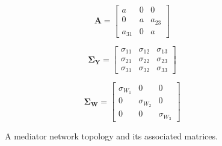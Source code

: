 \documentclass{article}
\begin{document}
\begin{figure}[H]
\centering

\def\figscale{1}

\begin{minipage}[c]{0.23\textwidth}
\centering

\def\a{1.2 cm}
\def\nodeSize{0.7}
\def\selfLoopR{0.5*\nodeSize cm}


\end{minipage}%
\hspace{0\textwidth}%
\begin{minipage}[c]{0.23\textwidth}
\raggedright

\[
\mathbf{A}=
\begin{bmatrix}
a & 0 & 0 \\
0 & a & a_{23} \\
a_{31} & 0 & a
\end{bmatrix}
\]

\end{minipage}%
\hspace{0.005\textwidth}%
\begin{minipage}[c]{0.25\textwidth}
\raggedright

\[
\mathbf{\Sigma_Y}=
\begin{bmatrix}
\sigma_{11} & \sigma_{12} & \sigma_{13} \\
\sigma_{21} & \sigma_{22} & \sigma_{23} \\
\sigma_{31} & \sigma_{32} & \sigma_{33}
\end{bmatrix}
\]

\end{minipage}%
\hspace{0.005\textwidth}%
\begin{minipage}[c]{0.27\textwidth}
\raggedright

\[
\mathbf{\Sigma_W}=
\begin{bmatrix}
\sigma_{W_1} & 0 & 0 \\
0 & \sigma_{W_2} & 0 \\
0 & 0 & \sigma_{W_3}
\end{bmatrix}
\]

\end{minipage}%

\caption{A mediator network topology and its associated matrices.}
\label{fig:network_mediator}
\end{figure}
\end{document}
